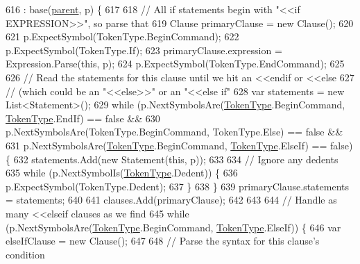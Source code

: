 \begin{DoxyCode}
616                                                              : base(\hyperlink{a00122_af313a82103fcc2ff5a177dbb06b92f7b}{parent}, p) \{
617 
618                 \textcolor{comment}{// All if statements begin with "<<if EXPRESSION>>", so parse that}
619                 Clause primaryClause = \textcolor{keyword}{new} Clause();
620 
621                 p.ExpectSymbol(TokenType.BeginCommand);
622                 p.ExpectSymbol(TokenType.If);
623                 primaryClause.expression = Expression.Parse(\textcolor{keyword}{this}, p);
624                 p.ExpectSymbol(TokenType.EndCommand);
625 
626                 \textcolor{comment}{// Read the statements for this clause until  we hit an <<endif or <<else}
627                 \textcolor{comment}{// (which could be an "<<else>>" or an "<<else if"}
628                 var statements = \textcolor{keyword}{new} List<Statement>();
629                 \textcolor{keywordflow}{while} (p.NextSymbolsAre(\hyperlink{a00031_a301aa7c866593a5b625a8fc158bbeace}{TokenType}.BeginCommand, 
      \hyperlink{a00031_a301aa7c866593a5b625a8fc158bbeace}{TokenType}.EndIf) == \textcolor{keyword}{false} &&
630                     p.NextSymbolsAre(TokenType.BeginCommand, TokenType.Else) == \textcolor{keyword}{false} &&
631                     p.NextSymbolsAre(\hyperlink{a00031_a301aa7c866593a5b625a8fc158bbeace}{TokenType}.BeginCommand, \hyperlink{a00031_a301aa7c866593a5b625a8fc158bbeace}{TokenType}.ElseIf) == \textcolor{keyword}{false}) 
      \{
632                     statements.Add(\textcolor{keyword}{new} Statement(\textcolor{keyword}{this}, p));
633 
634                     \textcolor{comment}{// Ignore any dedents}
635                     \textcolor{keywordflow}{while} (p.NextSymbolIs(\hyperlink{a00031_a301aa7c866593a5b625a8fc158bbeace}{TokenType}.Dedent)) \{
636                         p.ExpectSymbol(TokenType.Dedent);
637                     \}
638                 \}
639                 primaryClause.statements = statements;
640 
641                 clauses.Add(primaryClause);
642 
643 
644                 \textcolor{comment}{// Handle as many <<elseif clauses as we find}
645                 \textcolor{keywordflow}{while} (p.NextSymbolsAre(\hyperlink{a00031_a301aa7c866593a5b625a8fc158bbeace}{TokenType}.BeginCommand, 
      \hyperlink{a00031_a301aa7c866593a5b625a8fc158bbeace}{TokenType}.ElseIf)) \{
646                     var elseIfClause = \textcolor{keyword}{new} Clause();
647 
648                     \textcolor{comment}{// Parse the syntax for this clause's condition}

\end{DoxyCode}
